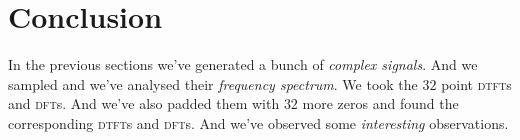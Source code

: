 \documentclass[../../course]{subfiles}
\begin{document}
\def\freqXOne{28}
\def\freqXTwo{56}
\def\freqXThree{56.1}

\def\sampFreqMuchLess{$f_{s} = \frac{4 \times 28}{2} = 56 \si{Hz}$}
\def\sampFreqNorm{$f_{s} = 4 \times 28 = 112 \si{Hz}$}
\def\sampFreqSligGreat{$122 \si{Hz}$}
\def\sampFreqMuchGreat{$f_{s} = 4 \times 28 \times 6 = 672 \si{Hz}$}

\def\sampFreqMuchLessJust{$56 \si{Hz}$}
\def\sampFreqNormJust{$112 \si{Hz}$}
\def\sampFreqSligGreatJust{$122 \si{Hz}$}
\def\sampFreqMuchGreatJust{$672 \si{Hz}$}

\pgfmathsetmacro{\endFreq}{((\freqXOne * 4) + 10)}


\section{Conclusion} \label{sec:conclusion}

In the previous sections we've generated a bunch of \emph{complex signals}. And
we sampled and we've analysed their \emph{frequency spectrum}. We took the
$32$ point \textsc{dtft}s and \textsc{dft}s. And we've also padded them with
$32$ more zeros and found the corresponding \textsc{dtft}s and \textsc{dft}s.
And we've observed some \emph{interesting} observations.
\end{document}
